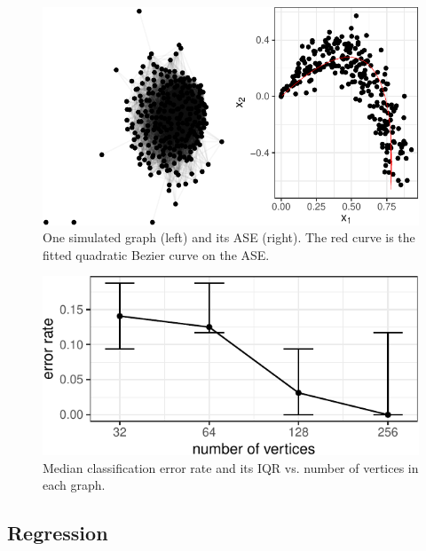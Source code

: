 \documentclass[12pt]{article}
\begin{document}
\begin{figure}[H]

{\centering \includegraphics{draft_files/figure-latex/class-sim-ase-1} 

}

\caption{One simulated graph (left) and its ASE (right). The red curve is the fitted quadratic Bezier curve on the ASE.}\label{fig:class-sim-ase}
\end{figure}

\begin{figure}[H]

{\centering \includegraphics{draft_files/figure-latex/classification-sim-1} 

}

\caption{Median classification error rate and its IQR vs. number of vertices in each graph.}\label{fig:classification-sim}
\end{figure}

\hypertarget{regression}{%
\subsection{Regression}\label{regression}}
\end{document}
